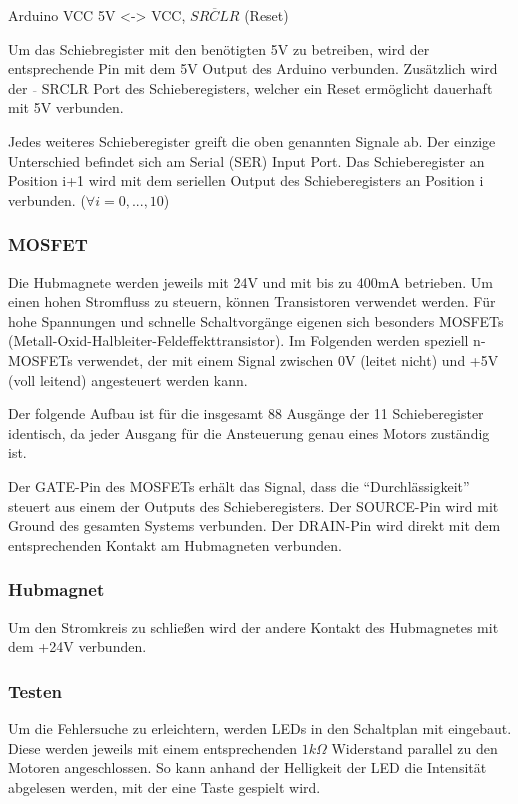 \begin{enumerate}
Arduino VCC 5V <-> VCC, $\overline{SRCLR}$ (Reset)

Um das Schiebregister mit den benötigten 5V zu betreiben, wird der entsprechende Pin mit dem 5V Output des Arduino verbunden.
Zusätzlich wird der $\overline{ }$ SRCLR Port des Schieberegisters, welcher ein Reset ermöglicht dauerhaft mit 5V verbunden.

Jedes weiteres Schieberegister greift die oben genannten Signale ab.
Der einzige Unterschied befindet sich am Serial (SER) Input Port.
Das Schieberegister an Position i+1 wird mit dem seriellen Output des Schieberegisters an Position i verbunden. ($\forall i = 0,...,10$)

\subsubsection{MOSFET}

Die Hubmagnete werden jeweils mit 24V und mit bis zu 400mA betrieben.
Um einen hohen Stromfluss zu steuern, können Transistoren verwendet werden.
Für hohe Spannungen und schnelle Schaltvorgänge eigenen sich besonders MOSFETs (Metall-Oxid-Halbleiter-Feldeffekttransistor).
Im Folgenden werden speziell n-MOSFETs verwendet, der mit einem Signal zwischen 0V (leitet nicht) und +5V (voll leitend) angesteuert werden kann.

Der folgende Aufbau ist für die insgesamt 88 Ausgänge der 11 Schieberegister identisch, da jeder Ausgang für die Ansteuerung genau eines Motors zuständig ist.

Der GATE-Pin des MOSFETs erhält das Signal, dass die ``Durchlässigkeit'' steuert aus einem der Outputs des Schieberegisters.
Der SOURCE-Pin wird mit Ground des gesamten Systems verbunden.
Der DRAIN-Pin wird direkt mit dem entsprechenden Kontakt am Hubmagneten verbunden.

\subsubsection{Hubmagnet}

Um den Stromkreis zu schließen wird der andere Kontakt des Hubmagnetes mit dem +24V verbunden.

\subsubsection{Testen}

Um die Fehlersuche zu erleichtern, werden LEDs in den Schaltplan mit eingebaut.
Diese werden jeweils mit einem entsprechenden $1k\Omega$ Widerstand parallel zu den Motoren angeschlossen.
So kann anhand der Helligkeit der LED die Intensität abgelesen werden, mit der eine Taste gespielt wird.


\end{enumerate}
